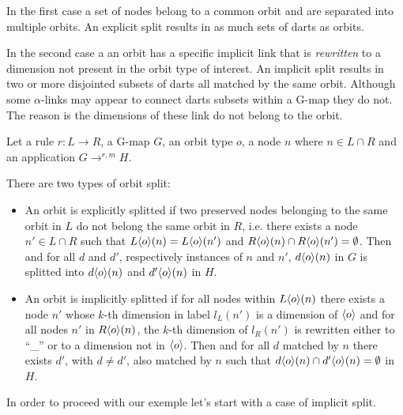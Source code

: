 \documentclass[times,twocolumn,final]{els-format/elsarticle}
\begin{document}
In the first case a set of nodes belong to a common orbit and are separated into
multiple orbits. An explicit split results in as much sets of darts as orbits.

In the second case a an orbit has a specific implicit link that is
\emph{rewritten} to a dimension not present in the orbit type of interest. An
implicit split results in two or more disjointed subsets of darts all matched
by the same orbit. Although some $\alpha$-links may appear to connect darts
subsets within a G-map they do not. The reason is the dimensions of these link
do not belong to the orbit.

\begin{definition}\label{def:split}
  Let a rule $r : L \longrightarrow R$, a G-map $G$, an orbit type $o$, a node
  $n$ where $n \in L \cap R$ and an application $G \longrightarrow^{r, m} H$.

  There are two types of orbit split:
  \begin{itemize}
    \item An orbit is explicitly splitted if two preserved nodes belonging to
          the same orbit in $L$ do not belong the same orbit in $R$, i.e. there
          exists a node $n' \in L \cap R$ such that
          $L\langle o\rangle(n) = L\langle o\rangle(n')$ and
          $R\langle o\rangle(n) \cap R\langle o\rangle(n') = \emptyset$. Then and for all $d$
          and $d'$, respectively instances of $n$ and $n'$, $d\langle o\rangle(n)$ in
          $G$ is splitted into $d\langle o\rangle(n)$ and $d'\langle o\rangle(n)$ in $H$.

    \item An orbit is implicitly splitted if for all nodes within
          $L\langle o\rangle(n)$ there exists a node $n'$ whose $k$-th dimension in
          label $l_{L}(n')$ is a dimension of $\langle o\rangle$ and for all nodes $n'$
          in $R\langle o\rangle(n)$, the $k$-th dimension of $l_{R}(n')$ is rewritten
          either to ``\_'' or to a dimension not in $\langle o\rangle$. Then and for
          all $d$ matched by $n$ there exists $d'$, with $d \neq d'$, also
          matched by $n$ such that
          $d\langle o\rangle(n) \cap d'\langle o\rangle(n) = \emptyset$ in $H$.
   \end{itemize}
\end{definition}


In order to proceed with our exemple let's start with a case of implicit split.
\end{document}
